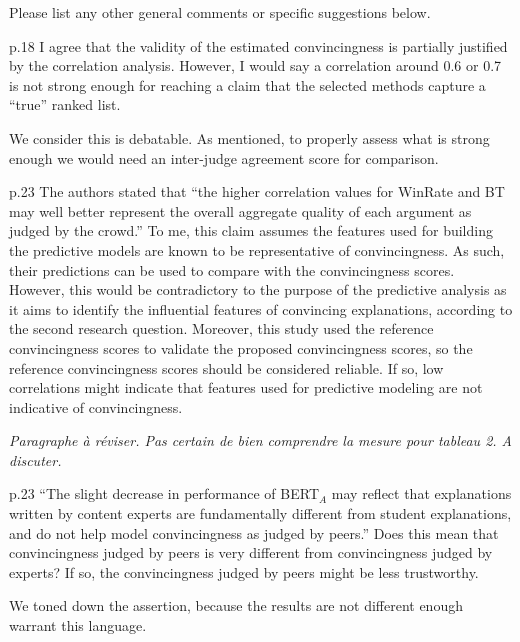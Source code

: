 \documentclass[notitlepage,12pt]{article}
\begin{document}
    \begin{revcomment}{Please list any other general comments or specific suggestions below.}

      p.18 I agree that the validity of the estimated convincingness is partially justified by the correlation analysis. However, I would say a correlation around 0.6 or 0.7 is not strong enough for reaching a claim that the selected methods capture a “true” ranked list.

      \begin{authors}
        We consider this is debatable. As mentioned, to properly assess what is strong enough we would need an inter-judge agreement score for comparison.  
      \end{authors}

      p.23 The authors stated that “the higher correlation values for WinRate and BT may well better represent the overall aggregate quality of each argument as judged by the crowd.” To me, this claim assumes the features used for building the predictive models are known to be representative of convincingness. As such, their predictions can be used to compare with the convincingness scores. However, this would be contradictory to the purpose of the predictive analysis as it aims to identify the influential features of convincing explanations, according to the second research question. Moreover, this study used the reference convincingness scores to validate the proposed convincingness scores, so the reference convincingness scores should be considered reliable. If so, low correlations might indicate that features used for predictive modeling are not indicative of convincingness.

      \begin{authors}
        \textit{Paragraphe à réviser.  Pas certain de bien comprendre la mesure pour tableau 2.  A discuter.}
      \end{authors}

      p.23 “The slight decrease in performance of BERT$_A$ may reflect that explanations written by content experts are fundamentally different from student explanations, and do not help model convincingness as judged by peers.” Does this mean that convincingness judged by peers is very different from convincingness judged by experts? If so, the convincingness judged by peers might be less trustworthy.

      \begin{authors}
        We toned down the assertion, because the results are not different enough warrant this language.
      \end{authors}


\end{revcomment}
\end{document}
